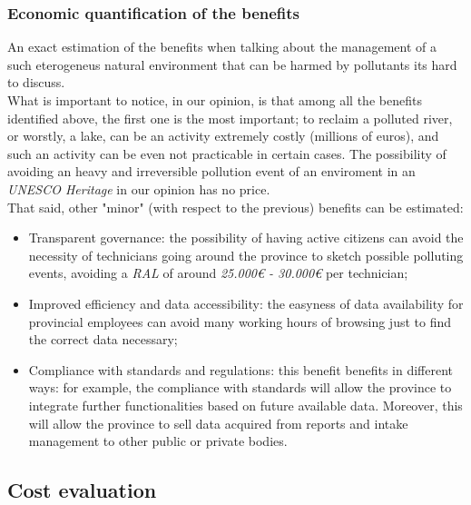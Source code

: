 \subsubsection{Economic quantification of the benefits}
An exact estimation of the benefits when talking about the management of a such eterogeneus natural environment that can be harmed by pollutants its hard to discuss. \\
What is important to notice, in our opinion, is that among all the benefits identified above, the first one is the most important; to reclaim a polluted river, or worstly, a lake, can be an activity extremely costly (millions of euros), and such an activity can be even not practicable in certain cases. The possibility of avoiding an heavy and irreversible pollution event of an enviroment in an \textit{UNESCO Heritage} in our opinion has no price. \\
That said, other "minor" (with respect to the previous) benefits can be estimated:
\begin{itemize}
    \item Transparent governance: the possibility of having active citizens can avoid the necessity of technicians going around the province to sketch possible polluting events, avoiding a \textit{RAL} of around \textit{25.000€ - 30.000€} per technician;
    \item Improved efficiency and data accessibility: the easyness of data availability for provincial employees can avoid many working hours of browsing just to find the correct data necessary;
    \item Compliance with standards and regulations: this benefit benefits in different ways: for example, the compliance with standards will allow the province to integrate further functionalities based on future available data. Moreover, this will allow the province to sell data acquired from reports and intake management to other public or private bodies.
\end{itemize}

\subsection{Cost evaluation}
